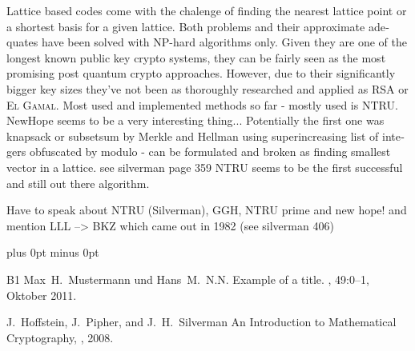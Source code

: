 \documentclass[a4paper,11pt,draft]{article}
\begin{document}
\begin{otherlanguage}{english}
\begin{multicols}{2}
Lattice based codes come with the chalenge of finding the nearest lattice point or a shortest basis for a given lattice. Both problems and their approximate adequates have been solved with NP-hard algorithms only. Given they are one of the longest known public key crypto systems,  they can be fairly seen as the most promising post quantum crypto approaches. However, due to their significantly bigger key sizes  they've not been as thoroughly researched and applied as \textsc{RSA} or \textsc{El Gamal}. \cite{IMC} 
Most used and implemented methods so far - mostly used is NTRU. NewHope seems to be a very interesting thing...
Potentially the first one was knapsack or subsetsum by Merkle and Hellman using superincreasing list of integers obfuscated by modulo  - can be formulated and broken as finding smallest vector in a lattice. see silverman page 359
NTRU seems to be the first successful and still out there algorithm.

Have to speak about NTRU (Silverman), GGH, NTRU prime and new hope!  and mention LLL --> BKZ which came out in 1982 (see silverman 406)




\todos

\begin{thebibliography}{1}
\itemsep=0cm plus 0pt minus 0pt


\bibitem
{B1}
Max~H.\ Mustermann und Hans~M.\ N.N.
\newblock Example of a title.
, 49:0--1, Oktober 2011.

J.~Hoffstein, J.~Pipher, and J.~H.~Silverman
\newblock An Introduction to Mathematical Cryptography,
, 2008.

\end{thebibliography}


\end{multicols}



\end{otherlanguage}
\end{document}
